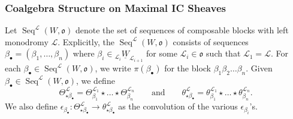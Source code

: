 \documentclass{amsart}
\newcommand{\scrL}{\mathcal{L}}
\newcommand{\fr}[1]{\mathfrak{#1}}
\DeclareMathOperator{\Seq}{Seq}
\newcommand{\uW}[2]{{}_{#1}\underline{W}_{#2}}
\theoremstyle{definition}
\numberwithin{equation}{subsection}
\begin{document}
\subsubsection{Coalgebra Structure on Maximal IC Sheaves}

Let $\Seq^{\scrL} (W, \fr{o})$ denote the set of sequences of composable blocks with left monodromy $\scrL$. 
Explicitly, the $\Seq^{\scrL} (W, \fr{o})$ consists of sequences $\beta_{\bullet} = (\beta_1, \ldots, \beta_n)$ where $\beta_i \in \uW{\scrL_i}{\scrL_{i+1}}$ for some $\scrL_i \in \fr{o}$ such that $\scrL_1 = \scrL$.
For each $\beta_{\bullet} \in \Seq^{\scrL} (W, \fr{o})$, we write $\pi (\beta_{\bullet})$ for the block $\beta_1 \beta_2 \ldots \beta_n$. 
Given $\beta_{\bullet} \in \Seq^{\scrL} (W, \fr{o})$, we define
\[\Theta^{\scrL}_{\star \beta_{\bullet}} = \Theta^{\scrL_1}_{\beta_1} \star \ldots \star \Theta^{\scrL_n}_{\beta_n} \qquad\text{and}\qquad \theta^{\scrL}_{\star \beta_{\bullet}} = \theta^{\scrL_1}_{\beta_1} \star \ldots \star \theta^{\scrL_n}_{\beta_n}. \]
We also define $\epsilon_{\beta_{\bullet}} : \Theta^{\scrL}_{\star \beta_{\bullet}} \to \theta^{\scrL}_{\star \beta_{\bullet}}$ as the convolution of the various $\epsilon_{\beta_i}$'s.
\end{document}
